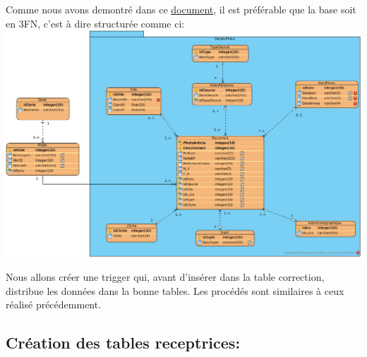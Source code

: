\documentclass[11pt]{article}
\makeatletter
\def\maxwidth{\ifdim\Gin@nat@width>\linewidth\linewidth
    \else\Gin@nat@width\fi}
\let\Oldincludegraphics\includegraphics
\renewcommand{\includegraphics}[1]{\Oldincludegraphics[width=.8\maxwidth]{#1}}
\makeatother
\begin{document}
Comme nous avons demontré dans ce \href{docs/schema.pdf}{document}, il
est préférable que la base soit en 3FN, c'est à dire structurée comme
ci: \includegraphics{pdfsrc/EntityRelationshipDiagram.png}

Nous allons créer une trigger qui, avant d'insérer dans la table
correction, distribue les données dans la bonne tables. Les procédés
sont similaires à ceux réalisé précédemment.

\hypertarget{cruxe9ation-des-tables-receptrices}{%
\subsection{Création des tables
receptrices:}\label{cruxe9ation-des-tables-receptrices}}
\end{document}
